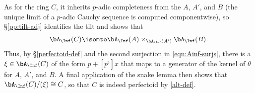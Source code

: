 As for the ring $C$, it inherits $p$-adic completeness from the $A$, $A'$, and $B$ (the unique limit of a $p$-adic Cauchy sequence is computed componentwise), so \S\ref{pp:tilt-adj} identifies the tilt and shows that
\[
\bA_\Inf(C) \isomto \bA_\Inf(A) \times_{\bA_\Inf(A')} \bA_\Inf(B).
\]
Thus, by \S\ref{perfectoid-def} and the second surjection in \eqref{eqn:Ainf-surjs}, there is a $\xi \in \bA_\Inf(C)$ of the form $p + [p^\flat]x$ that maps to a generator of the kernel of $\theta$ for $A$, $A'$, and $B$. A final application of the snake lemma then shows that $\bA_\Inf(C)/(\xi) \cong C$, so that $C$ is indeed perfectoid by \eqref{alt-def}.
